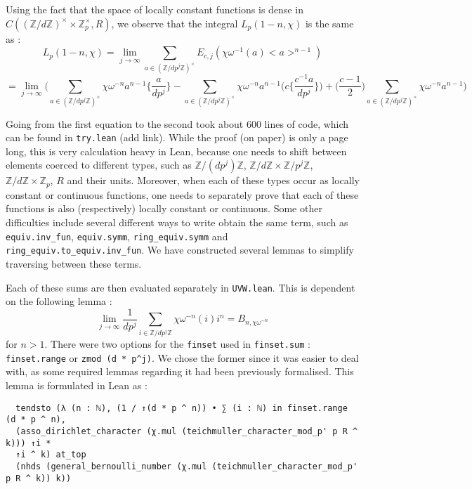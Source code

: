 \documentclass[a4paper,UKenglish,cleveref, autoref, thm-restate]{lipics-v2021}
\newcommand{\lean}[1]{\texttt{#1}\xspace} %
\begin{document}
Using the fact that the space of locally constant functions is dense in $C((\mathbb{Z}/d \mathbb{Z})^{\times} \times \mathbb{Z}_p^{\times}, R)$, 
we observe that the integral $L_p (1 - n, \chi)$ is the same as :
$$ L_p (1 - n, \chi) = \lim_{j \to \infty} \sum_{a \in (\mathbb{Z}/ d p^j \mathbb{Z})^{\times}} E_{c, j} (\chi \omega^{-1} (a) <a>^{n - 1}) \label{eqn:1} $$
$$ = \lim_{j \to \infty} \bigg ( \sum_{a \in (\mathbb{Z}/ d p^j \mathbb{Z})^{\times}} \chi \omega^{-n} a^{n - 1} \bigg \{ \frac{a}{d p^j} \bigg \} - 
  \sum_{a \in (\mathbb{Z}/ d p^j \mathbb{Z})^{\times}} \chi \omega^{-n} a^{n - 1} \bigg ( c \bigg \{ \frac{c^{-1} a}{d p^j} \bigg \} \bigg ) 
  + \bigg ( \frac{c - 1}{2} \bigg ) \sum_{a \in (\mathbb{Z}/ d p^j \mathbb{Z})^{\times}} \chi \omega^{-n} a^{n - 1} \bigg ) $$

Going from the first equation to the second took about 600 lines of code, which can be found in \lean{try.lean} (add link). While the proof (on paper) is only a page long, 
this is very calculation heavy in Lean, because one needs to shift between elements coerced to different types, such as $\mathbb{Z}/ (d p^j) \mathbb{Z}$, 
$\mathbb{Z}/ d \mathbb{Z} \times \mathbb{Z}/ p^j \mathbb{Z}$, $\mathbb{Z}/ d \mathbb{Z} \times \mathbb{Z}_p$, $R$ and their units. Moreover, when each of these types occur 
as locally constant or continuous functions, one needs to separately prove that each of these functions 
is also (respectively) locally constant or continuous. Some other difficulties include several different ways to write obtain the same term, such as \lean{equiv.inv\_fun}, 
\lean{equiv.symm}, \lean{ring\_equiv.symm} and \lean{ring\_equiv.to\_equiv.inv\_fun}. We have constructed several lemmas to simplify traversing between these terms. 

Each of these sums are then evaluated separately in \lean{UVW.lean}. This is dependent on the following lemma : 
$$ \lim_{j \to \infty} \frac{1}{d p^j} \sum_{i \in \mathbb{Z}/ d p^j \mathbb{Z}} \chi \omega^{-n} (i) i^n = B_{n, \chi \omega^{-n}} $$ 
for $n > 1$. There were two options for the \lean{finset} used in \lean{finset.sum} : \lean{finset.range} or \lean{zmod (d * p\textasciicircum j)}. 
We chose the former since it was easier to deal with, as some required lemmas regarding it had been previously formalised. This lemma is 
formulated in Lean as :
\begin{lstlisting}
  tendsto (λ (n : ℕ), (1 / ↑(d * p ^ n)) • ∑ (i : ℕ) in finset.range (d * p ^ n),
  (asso_dirichlet_character (χ.mul (teichmuller_character_mod_p' p R ^ k))) ↑i * 
  ↑i ^ k) at_top
  (nhds (general_bernoulli_number (χ.mul (teichmuller_character_mod_p' p R ^ k)) k))
\end{lstlisting}
\end{document}
